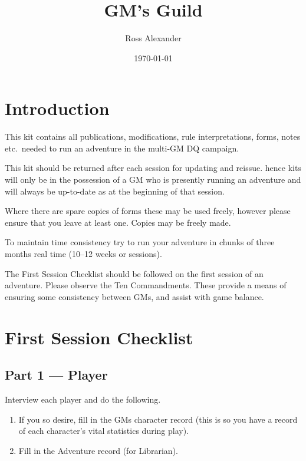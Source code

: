 \documentclass{article}
\title{GM's Guild}
\author{Ross Alexander}
\date{\today}
\begin{document}
\maketitle
\tableofcontents

\pagebreak

\begin{multicols}{2}

\section{Introduction}

This kit contains all publications, modifications, rule
interpretations, forms, notes etc.\ needed to run an adventure in the
multi-GM DQ campaign.

This kit should be returned after each session for updating and
reissue.  hence kits will only be in the possession of a GM who is
presently running an adventure and will always be up-to-date as at the
beginning of that session.

Where there are spare copies of forms these may be used freely,
however please ensure that you leave at least one.  Copies may be
freely made.

To maintain time consistency try to run your adventure in chunks of
three months real time (10--12 weeks or sessions).

The First Session Checklist should be followed on the first session of
an adventure.  Please observe the Ten Commandments.  These provide a
means of ensuring some consistency between GMs, and assist with game
balance.

\section{First Session Checklist}

\subsection{Part 1 --- Player}

Interview each player and do the following.

\begin{enumerate}

\item
If you so desire, fill in the GMs character record (this is so you
have a record of each character's vital statistics during play).

\item
Fill in the Adventure record (for Librarian).


\end{enumerate}
\end{multicols}
\end{document}
